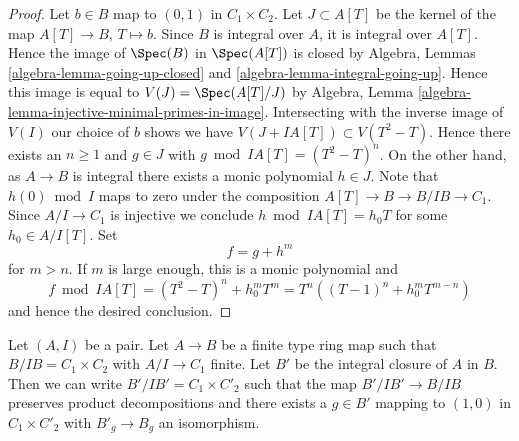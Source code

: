\begin{proof}
Let $b \in B$ map to $(0, 1)$ in $C_1 \times C_2$.
Let $J \subset A[T]$ be the kernel of the map $A[T] \to B$, $T \mapsto b$.
Since $B$ is integral over $A$, it is integral over $A[T]$. Hence
the image of $\Spec(B)$ in $\Spec(A[T])$ is closed by
Algebra, Lemmas \ref{algebra-lemma-going-up-closed} and
\ref{algebra-lemma-integral-going-up}. Hence this image is
equal to $V(J) = \Spec(A[T]/J)$ by
Algebra, Lemma \ref{algebra-lemma-injective-minimal-primes-in-image}.
Intersecting with the inverse image of $V(I)$ our choice of $b$ shows
we have $V(J + IA[T]) \subset V(T^2 - T)$. Hence there exists an $n \geq 1$
and $g \in J$ with $g \bmod IA[T] = (T^2 - T)^n$.
On the other hand, as $A \to B$ is integral there exists a monic
polynomial $h \in J$. Note that $h(0) \bmod I$ maps to zero
under the composition $A[T] \to B \to B/IB \to C_1$. Since $A/I \to C_1$
is injective we conclude $h \bmod IA[T] = h_0 T$ for some $h_0 \in A/I[T]$.
Set
$$
f = g + h^m
$$
for $m > n$. If $m$ is large enough, this is a monic polynomial and
$$
f \bmod IA[T] = (T^2 - T)^n + h_0^m T^m =
T^n((T - 1)^n + h_0^m T^{m - n})
$$
and hence the desired conclusion.
\end{proof}

\begin{lemma}
\label{lemma-helper-finite-type}
Let $(A, I)$ be a pair. Let $A \to B$ be a finite type ring map
such that $B/IB = C_1 \times C_2$ with $A/I \to C_1$ finite.
Let $B'$ be the integral closure of $A$ in $B$.
Then we can write $B'/IB' = C_1 \times C'_2$ such that
the map $B'/IB' \to B/IB$ preserves product decompositions
and there exists a $g \in B'$ mapping to $(1, 0)$ in
$C_1 \times C'_2$ with $B'_g \to B_g$ an isomorphism.
\end{lemma}

